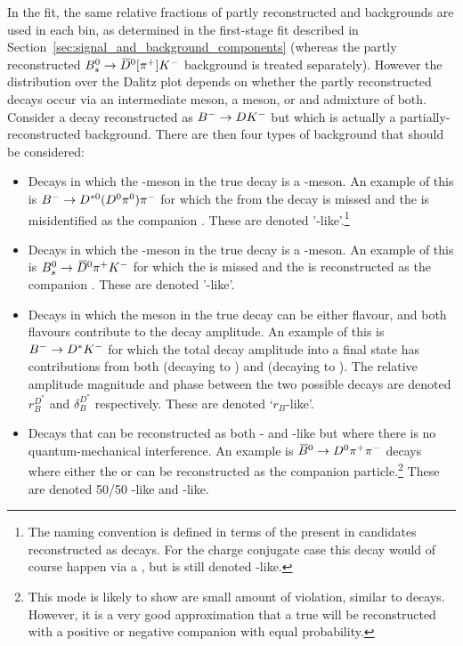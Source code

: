 In the \CP fit, the same relative fractions of partly reconstructed \Bpm and \Bz backgrounds are used in each bin, as determined in the first-stage fit described in Section~\ref{sec:signal_and_background_components} (whereas the partly reconstructed ${{B}^0_{s}}\rightarrow{\ensuremath{{\kern 0.18em\overline{\kern -0.18em D}}{}^0}}[\pi^+]K^-$ background is treated separately). However the distribution over the Dalitz plot depends on whether the partly reconstructed decays occur via an intermediate \Dz meson, a \Dzb meson, or and admixture of both. Consider a decay reconstructed as ${{{B}^-}}\rightarrow{\ensuremath{D}}{\ensuremath{{K}^-}}$ but which is actually a partially-reconstructed background. There are then four types of background that should be considered:
\begin{itemize}
\item Decays in which the \PD-meson in the true decay is a \Dz-meson. An example of this is ${{{B}^-}}\rightarrow{\ensuremath{{D}^{*0}}}({{D}^0}{{\pi}^0}){{\pi}^-}$ for which the \piz from the \Dstarz decay is missed and the \pim is misidentified as the companion \Km. These are denoted '\Dz-like'.\footnote{The naming convention is defined in terms of the \D present in candidates reconstructed as \Bm decays. For the charge conjugate case this decay would of course happen via a \Dzb, but is still denoted \Dz-like.}

\item Decays in which the \PD-meson in the true decay is a \Dzb-meson. An example of this is ${{B}^0_{s}}\rightarrow{\ensuremath{{\kern 0.18em\overline{\kern -0.18em D}}{}^0}}{\ensuremath{{\pi}^+}}{\ensuremath{{K}^-}}$ for which the \pip is missed and the \Km is reconstructed as the companion \Km. These are denoted '\Dzb-like'.

\item Decays in which the \PD meson in the true decay can be either flavour, and both \D flavours contribute to the decay amplitude. An example of this is ${{{B}^-}}\rightarrow{\ensuremath{{D}^*}}{\ensuremath{{K}^-}}$ for which the total decay amplitude into a \D final state has contributions from both \Dstarz (decaying to \Dz) and \Dstarzb (decaying to \Dzb). The relative amplitude magnitude and phase between the two possible \PB decays are denoted $r_{B}^{D^*}$ and $\delta_{B}^{D^*}$ respectively. These are denoted  `$r_B$-like'. %

\item Decays that can be reconstructed as both \Dz- and \Dzb-like but where there is no quantum-mechanical interference. An example is ${{\kern 0.18em\overline{\kern -0.18em B}}{}^0}\rightarrow{\ensuremath{{D}^0}}{\ensuremath{{\pi}^+}}{\ensuremath{{\pi}^-}}$ decays where either the \pip or \pim can be reconstructed as the companion particle.\footnote{This mode is likely to show are small amount of \CP violation, similar to \BtoDpi decays. However, it is a very good approximation that a true \Dz will be reconstructed with a positive or negative companion with equal probability.} These are denoted 50/50 \Dz-like and \Dzb-like. 

\end{itemize}
